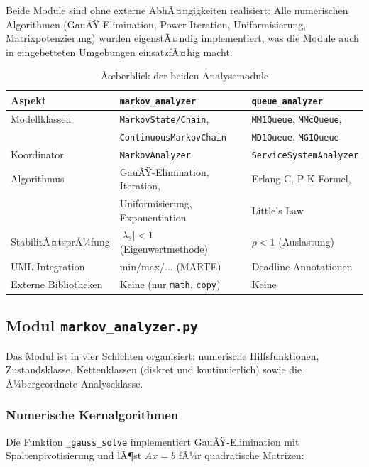 ﻿\documentclass[a4paper,12pt]{scrreprt}
\theoremstyle{definition}
\begin{document}
Beide Module sind ohne externe AbhÃ¤ngigkeiten realisiert: Alle numerischen
Algorithmen (GauÃŸ-Elimination, Power-Iteration, Uniformisierung,
Matrixpotenzierung) wurden eigenstÃ¤ndig implementiert, was die Module
auch in eingebetteten Umgebungen einsatzfÃ¤hig macht.

\begin{table}[H]
	\centering
	\begin{tabular}{@{}lll@{}}
		\toprule
		\textbf{Aspekt} & \textbf{\texttt{markov\_analyzer}} & \textbf{\texttt{queue\_analyzer}} \\
		\midrule
		Modellklassen & \texttt{MarkovState/Chain}, &
		\texttt{MM1Queue}, \texttt{MMcQueue}, \\
		& \texttt{ContinuousMarkovChain} & \texttt{MD1Queue}, \texttt{MG1Queue} \\
		Koordinator & \texttt{MarkovAnalyzer} & \texttt{ServiceSystemAnalyzer} \\
		Algorithmus & GauÃŸ-Elimination, Iteration, & Erlang-C, P-K-Formel, \\
		& Uniformisierung, Exponentiation & Little's Law \\
		StabilitÃ¤tsprÃ¼fung & $|\lambda_2| < 1$ (Eigenwertmethode) & $\rho < 1$ (Auslastung) \\
		UML-Integration & min/max/... (MARTE) & Deadline-Annotationen \\
		Externe Bibliotheken & Keine (nur \texttt{math}, \texttt{copy}) & Keine \\
		\bottomrule
	\end{tabular}
	\caption{Ãœberblick der beiden Analysemodule}
	\label{tab:module-uebersicht}
\end{table}

\subsection{Modul \texttt{markov\_analyzer.py}}
\label{sec:markov-analyzer-impl}

Das Modul ist in vier Schichten organisiert: numerische Hilfsfunktionen,
Zustandsklasse, Kettenklassen (diskret und kontinuierlich) sowie die
Ã¼bergeordnete Analyseklasse.

\subsubsection{Numerische Kernalgorithmen}

Die Funktion \texttt{\_gauss\_solve} implementiert GauÃŸ-Elimination mit
Spaltenpivotisierung und lÃ¶st $Ax = b$ fÃ¼r quadratische Matrizen:
\end{document}
